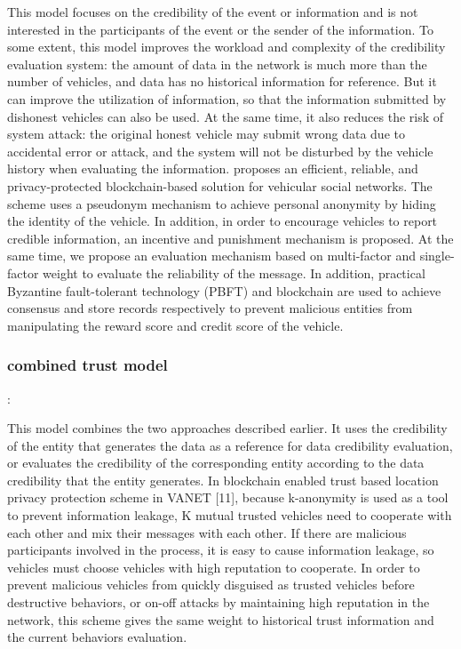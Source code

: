 This model focuses on the credibility of the event or information and is not interested in the participants of the event or the sender of the information. To some extent, this model improves the workload and complexity of the credibility evaluation system: the amount of data in the network is much more than the number of vehicles, and data has no historical information for reference. But it can improve the utilization of information, so that the information submitted by dishonest vehicles can also be used. At the same time, it also reduces the risk of system attack: the original honest vehicle may submit wrong data due to accidental error or attack, and the system will not be disturbed by the vehicle history when evaluating the information. \cite{ref73} proposes an efficient, reliable, and privacy-protected blockchain-based solution for vehicular social networks. The scheme uses a pseudonym mechanism to achieve personal anonymity by hiding the identity of the vehicle. In addition, in order to encourage vehicles to report credible information, an incentive and punishment mechanism is proposed. At the same time, we propose an evaluation mechanism based on multi-factor and single-factor weight to evaluate the reliability of the message. In addition, practical Byzantine fault-tolerant technology (PBFT) and blockchain are used to achieve consensus and store records respectively to prevent malicious entities from manipulating the reward score and credit score of the vehicle.


\subsubsection{\bf combined trust model}:

This model combines the two approaches described earlier. It uses the credibility of the entity that generates the data as a reference for data credibility evaluation, or evaluates the credibility of the corresponding entity according to the data credibility that the entity generates. In blockchain enabled trust based location privacy protection scheme in VANET [11], because k-anonymity is used as a tool to prevent information leakage, K mutual trusted vehicles need to cooperate with each other and mix their messages with each other. If there are malicious participants involved in the process, it is easy to cause information leakage, so vehicles must choose vehicles with high reputation to cooperate. In order to prevent malicious vehicles from quickly disguised as trusted vehicles before destructive behaviors, or on-off attacks by maintaining high reputation in the network, this scheme gives the same weight to historical trust information and the current behaviors evaluation.





